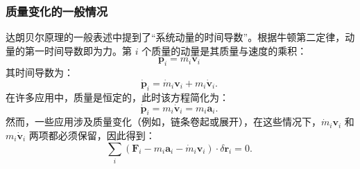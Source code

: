 \subsubsection{质量变化的一般情况}

达朗贝尔原理的一般表述中提到了“系统动量的时间导数”。根据牛顿第二定律，动量的第一时间导数即为力。第 \( i \) 个质量的动量是其质量与速度的乘积：
\[
\mathbf{p}_i = m_i \mathbf{v}_i~
\]
其时间导数为：
\[
\dot{\mathbf{p}}_i = \dot{m}_i \mathbf{v}_i + m_i \dot{\mathbf{v}}_i.~
\]
在许多应用中，质量是恒定的，此时该方程简化为：
\[
\dot{\mathbf{p}}_i = m_i \dot{\mathbf{v}}_i = m_i \mathbf{a}_i.~
\]
然而，一些应用涉及质量变化（例如，链条卷起或展开），在这些情况下，\(\dot{m}_i \mathbf{v}_i\) 和 \(m_i \dot{\mathbf{v}}_i\) 两项都必须保留，因此得到：
\[
\sum_{i} \left( \mathbf{F}_i - m_i \mathbf{a}_i - \dot{m}_i \mathbf{v}_i \right) \cdot \delta \mathbf{r}_i = 0.~
\]